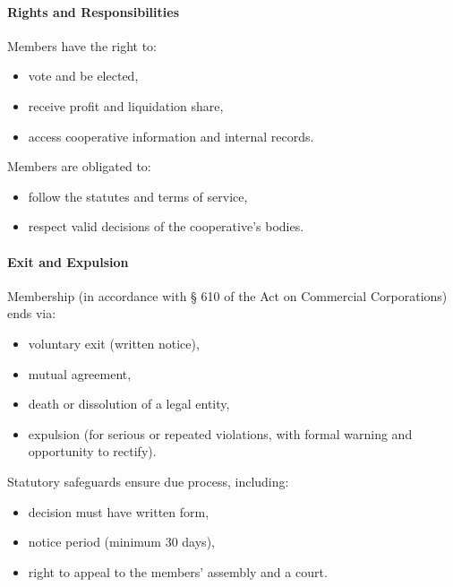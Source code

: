 \paragraph{Rights and Responsibilities}
Members have the right to:
\begin{itemize}
    \item vote and be elected,
    \item receive profit and liquidation share,
    \item access cooperative information and internal records.
\end{itemize}
Members are obligated to:
\begin{itemize}
    \item follow the statutes and terms of service,
    \item respect valid decisions of the cooperative’s bodies.
\end{itemize}

\paragraph{Exit and Expulsion}
Membership (in accordance with § 610 of the Act on Commercial Corporations) ends via:
\begin{itemize}
    \item voluntary exit (written notice),
    \item mutual agreement,
    \item death or dissolution of a legal entity,
    \item expulsion (for serious or repeated violations, with formal warning and opportunity to rectify).
\end{itemize}

Statutory safeguards ensure due process, including:
\begin{itemize}
    \item decision must have written form,
    \item notice period (minimum 30 days),
    \item right to appeal to the members’ assembly and a court.
\end{itemize}

